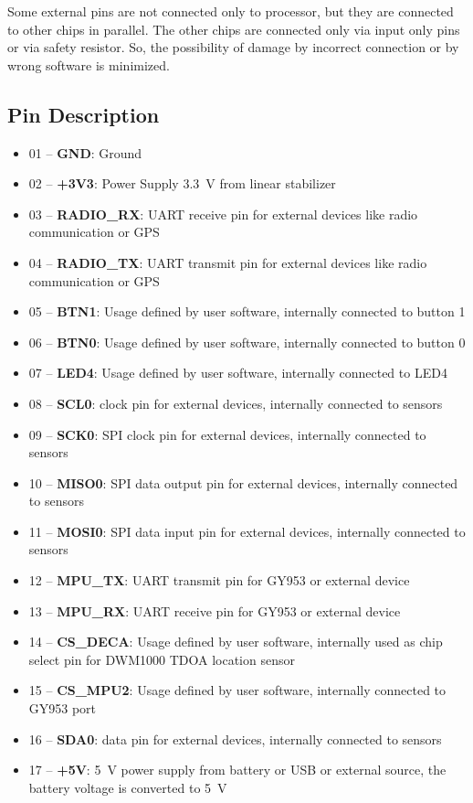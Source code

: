 \begin{remark}
	Some external pins are not connected only to processor, but they are connected to other chips in parallel. The other chips are connected only via input only pins or via safety resistor. So, the possibility of damage by incorrect connection or by wrong software is minimized.
\end{remark}

\subsection{Pin Description}
\begin{itemize}
	\setlength\itemsep{0.2em}
	\item 01 -- \textbf{GND}: Ground
	\item 02 -- \textbf{+3V3}: Power Supply \SI{+3.3}{V} from linear stabilizer
	\item 03 -- \textbf{RADIO\_RX}: UART receive pin for external devices like radio communication or GPS
	\item 04 -- \textbf{RADIO\_TX}: UART transmit pin for external devices like radio communication or GPS
	\item 05 -- \textbf{BTN1}: Usage defined by user software, internally connected to button 1
	\item 06 -- \textbf{BTN0}: Usage defined by user software, internally connected to button 0
	\item 07 -- \textbf{LED4}: Usage defined by user software, internally connected to LED4
	\item 08 -- \textbf{SCL0}: \itwoc clock pin for external devices, internally connected to sensors
	\item 09 -- \textbf{SCK0}: SPI clock pin for external devices, internally connected to sensors
	\item 10 -- \textbf{MISO0}: SPI data output pin for external devices, internally connected to sensors
	\item 11 -- \textbf{MOSI0}: SPI data input pin for external devices, internally connected to sensors
	\item 12 -- \textbf{MPU\_TX}: UART transmit pin for GY953 or external device
	\item 13 -- \textbf{MPU\_RX}: UART receive pin for GY953 or external device
	\item 14 -- \textbf{CS\_DECA}: Usage defined by user software, internally used as chip select pin for DWM1000 TDOA location sensor
	\item 15 -- \textbf{CS\_MPU2}: Usage defined by user software, internally connected to GY953 port
	\item 16 -- \textbf{SDA0}: \itwoc data pin for external devices, internally connected to sensors
	\item 17 -- \textbf{+5V}: \SI{+5}{V} power supply from battery or \ac{USB} or external source, the battery voltage is converted to \SI{5}{V}
\end{itemize}

